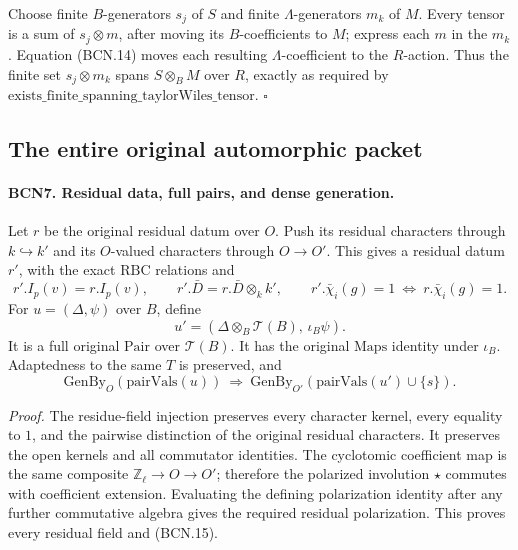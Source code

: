 Choose finite \(B\)-generators \(s_j\) of \(S\) and finite
\(\Lambda\)-generators \(m_k\) of \(M\).
Every tensor is a sum of \(s_j\otimes m\), after moving its
\(B\)-coefficients to \(M\); express each \(m\) in the \(m_k\).
Equation (BCN.14) moves each resulting \(\Lambda\)-coefficient
to the \(R\)-action.  Thus the finite set \(s_j\otimes m_k\)
spans \(S\otimes_B M\) over \(R\), exactly as required by
\(\mathrm{exists\_finite\_spanning\_taylorWiles\_tensor}\).
\hfill\(\square\)

\subsection{The entire original automorphic packet}

\paragraph{BCN7. Residual data, full pairs, and dense generation.}\label{claim:BCN7}
Let \(r\) be the original residual datum over \(O\).
Push its residual characters through \(k\hookrightarrow k'\)
and its \(O\)-valued characters through \(O\to O'\).
This gives a residual datum \(r'\), with the exact \(\mathrm{RBC}\)
relations and
\[
 r'.I_p(v)=r.I_p(v),\qquad
 r'.\bar D=r.\bar D\otimes_k k',\qquad
 r'.\bar\chi_i(g)=1\ \Longleftrightarrow\ r.\bar\chi_i(g)=1 .
                                                               \tag{BCN.15}
\]
For \(u=(\Delta,\psi)\) over \(B\), define
\[
 u'=(\Delta\otimes_B\mathscr T(B),\,\iota_B\psi).
                                                               \tag{BCN.16}
\]
It is a full original \(\mathrm{Pair}\) over \(\mathscr T(B)\).
It has the original \(\mathrm{Maps}\) identity under \(\iota_B\).
Adaptedness to the same \(T\) is preserved, and
\[
 \mathrm{GenBy}_O(\mathrm{pairVals}(u))
 \ \Longrightarrow\
 \mathrm{GenBy}_{O'}
       (\mathrm{pairVals}(u')\cup\{s\}).                         \tag{BCN.17}
\]

\emph{Proof.}
The residue-field injection preserves every character kernel,
every equality to \(1\), and the pairwise distinction of the
original residual characters.  It preserves the open kernels
and all commutator identities.  The cyclotomic coefficient
map is the same composite \(\mathbb Z_\ell\to O\to O'\);
therefore the polarized involution \(\star\) commutes with
coefficient extension.  Evaluating the defining polarization
identity after any further commutative algebra gives the
required residual polarization.  This proves every residual
field and (BCN.15).


